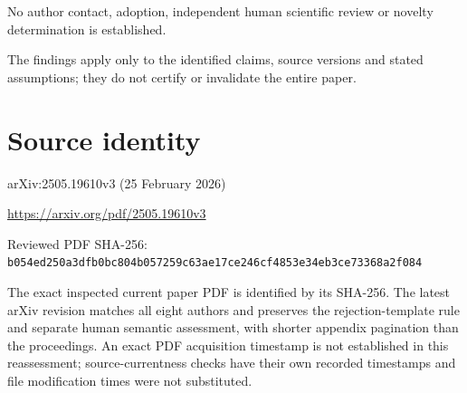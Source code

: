 \documentclass[11pt]{article}
\begin{document}
No author contact, adoption, independent human scientific review or novelty determination is established.\par

The findings apply only to the identified claims, source versions and stated assumptions; they do not certify or invalidate the entire paper.\par

\section*{Source identity}

arXiv:2505.19610v3 (25 February 2026)

\url{https://arxiv.org/pdf/2505.19610v3}

Reviewed PDF SHA-256: \nolinkurl{b054ed250a3dfb0bc804b057259c63ae17ce246cf4853e34eb3ce73368a2f084}

The exact inspected current paper PDF is identified by its SHA-256. The latest arXiv revision matches all eight authors and preserves the rejection-template rule and separate human semantic assessment, with shorter appendix pagination than the proceedings. An exact PDF acquisition timestamp is not established in this reassessment; source-currentness checks have their own recorded timestamps and file modification times were not substituted.
\end{document}
